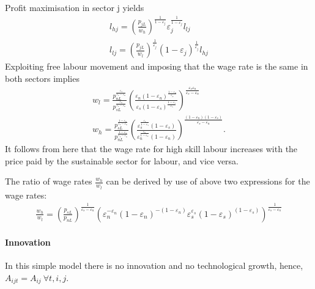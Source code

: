 Profit maximisation in sector j yields
\begin{align*}
l_{hj}= \left(\frac{p_{jL}}{w_h}\right)^{\frac{1}{1-\varepsilon_j}}\varepsilon_j^{\frac{1}{1-\varepsilon_j}}l_{lj}\\
l_{lj}= \left(\frac{p_{jL}}{w_l}\right)^\frac{1}{\varepsilon_j}(1-\varepsilon_j)^\frac{1}{\varepsilon_j}l_{hj}
\end{align*}
Exploiting free labour movement and imposing that the wage rate is the same in both sectors implies
\begin{align*}
 w_l= \frac{p_{nL}^\frac{\varepsilon_s}{\varepsilon_s-\varepsilon_n}}{p_{sL}^\frac{\varepsilon_n}{\varepsilon_s-\varepsilon_n}}\left(\frac{\varepsilon_n(1-\varepsilon_n)^\frac{1-\varepsilon_n}{\varepsilon_n}}{\varepsilon_s(1-\varepsilon_s)^\frac{1-\varepsilon_s}{\varepsilon_s}}\right)^\frac{\varepsilon_s\varepsilon_n}{\varepsilon_s-\varepsilon_n}\\
 w_h= \frac{p_{sL}^\frac{1-\varepsilon_n}{\varepsilon_s-\varepsilon_n}}{p_{nL}^\frac{1-\varepsilon_s}{\varepsilon_s-\varepsilon_n}}\left(\frac{\varepsilon_s^\frac{\varepsilon_s}{1-\varepsilon_s}(1-\varepsilon_s)}{\varepsilon_n^\frac{\varepsilon_n}{1-\varepsilon_n}(1-\varepsilon_n)}\right)^\frac{(1-\varepsilon_n)(1-\varepsilon_s)}{\varepsilon_s-\varepsilon_n}.
\end{align*}
It follows from here that the wage rate for high skill labour increases with the price paid by the sustainable sector for labour, and vice versa. 

The ratio of wage rates $\frac{w_h}{w_l}$ can be derived by use of above two expressions for the wage rates:
\begin{align}
\frac{w_h}{w_l}=\left(\frac{p_{sL}}{p_{nL}}\right)^\frac{1}{\varepsilon_s-\varepsilon_n}\left(\varepsilon_n^{-\varepsilon_n} (1-\varepsilon_n)^{-(1-\varepsilon_n)}\varepsilon_s^{\varepsilon_s} (1-\varepsilon_s)^{(1-\varepsilon_s)} \right)^\frac{1}{\varepsilon_s-\varepsilon_n}\label{eq:labourFirm_labrel}
\end{align}

\paragraph{Innovation}
In this simple model there is no innovation and no technological growth, hence, $A_{ijt}=A_{ij}\ \forall t, i, j$.


